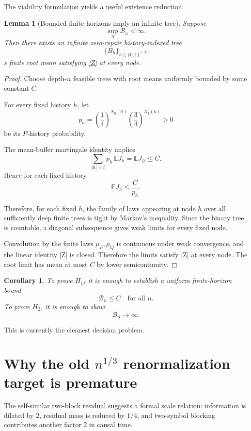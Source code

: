\documentclass[11pt,a4paper]{article}
\newtheorem{lemma}[theorem]{Lemma}
\newtheorem{corollary}[theorem]{Corollary}
\newcommand{\E}{\mathbb E}
\newcommand{\cB}{\mathcal B}
\newcommand{\bits}{\{0,1\}}
\begin{document}
The viability formulation yields a useful existence reduction.

\begin{lemma}[Bounded finite horizons imply an infinite tree]
Suppose
\[
\sup_n \cB_n<\infty.
\]
Then there exists an infinite zero-repair history-indexed tree
\[
\{B_h\}_{h\in\bits^{<\infty}}
\]
s finite root mean satisfying \eqref{Z} at every node.
\end{lemma}

\begin{proof}
Choose depth-\(n\) feasible trees with root means uniformly bounded by some
constant \(C\).

For every fixed history \(h\), let
\[
p_h
=
\left(\frac14\right)^{N_0(h)}
\left(\frac34\right)^{N_1(h)}
>0
\]
be its \(P\)-history probability.

The mean-buffer martingale identity implies
\[
\sum_{|h|=t}p_h\,\E J_h
=
\E J_\varnothing
\le C.
\]
Hence for each fixed history
\[
\E J_h
\le
\frac C{p_h}.
\]

Therefore, for each fixed \(h\), the family of laws appearing at node \(h\)
over all sufficiently deep finite trees is tight by Markov's inequality.
Since the binary tree is countable, a diagonal subsequence gives weak limits
for every fixed node.

Convolution by the finite laws \(\mu_P,\mu_Q\) is continuous under weak
convergence, and the linear identity \eqref{Z} is closed.  Therefore the
limits satisfy \eqref{Z} at every node.  The root limit has mean at most
\(C\) by lower semicontinuity.
\end{proof}

\begin{corollary}
To prove \(H_1\), it is enough to establish a uniform finite-horizon bound
\[
\boxed{
\cB_n\le C
\quad
\text{for all }n.
}
\]
To prove \(H_2\), it is enough to show
\[
\boxed{
\cB_n\to\infty.
}
\]
\end{corollary}

This is currently the cleanest decision problem.

\section{Why the old \(n^{1/3}\) renormalization target is premature}

The self-similar two-block residual suggests a formal scale relation:
information is dilated by \(2\), residual mass is reduced by \(1/4\), and
two-symbol blocking contributes another factor \(2\) in causal time.
\end{document}
